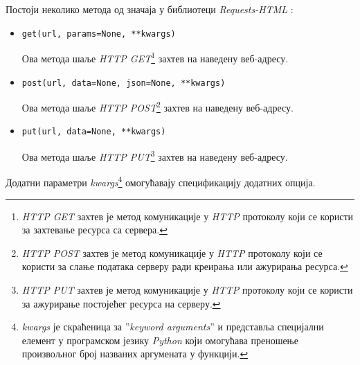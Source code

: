 \documentclass[12pt,oneside]{memoir}
\begin{document}
Постоји неколико метода од значаја у библиотеци \textit{Requests-HTML} \cite{WebScrapingWithPython}:
\begin{itemize}
    \item \begin{verbatim}get(url, params=None, **kwargs) \end{verbatim}
    Ова метода шаље \textit{HTTP GET}\footnote{\textit{HTTP GET} захтев је метод комуникације у \textit{HTTP} протоколу који се користи за захтевање ресурса са сервера.} захтев на наведену веб-адресу. 
  \item \begin{verbatim}post(url, data=None, json=None, **kwargs)\end{verbatim}
    Ова метода шаље \textit{HTTP POST}\footnote{\textit{HTTP POST} захтев је метод комуникације у \textit{HTTP} протоколу који се користи за слање података серверу ради креирања или ажурирања ресурса.} захтев на наведену веб-адресу. 
  \item \begin{verbatim}put(url, data=None, **kwargs)\end{verbatim}
    Ова метода шаље \textit{HTTP PUT}\footnote{\textit{HTTP PUT} захтев је метод комуникације у \textit{HTTP} протоколу који се користи за ажурирање постојећег ресурса на серверу.} захтев на наведену веб-адресу. 
\end{itemize}
Додатни параметри \textit{kwargs}\footnote{\textit{kwargs} је скраћеница за ”\textit{keyword arguments}” и представља специјални елемент у програмском језику \textit{Python} који омогућава преношење произвољног број названих аргумената у функцији.} омогућавају спецификацију додатних опција.
 
\end{document}

